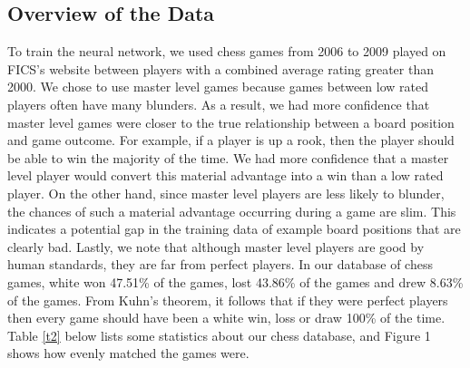 \documentclass[12pt]{article}
\begin{document}


\subsection{Overview of the Data}
To train the neural network, we used chess games from 2006 to 2009 played on FICS's website between players with a combined average rating greater than 2000. We chose to use master level games because games between low rated players often have many blunders. As a result, we had more confidence that master level games were closer to the true relationship between a board position and game outcome. For example, if a player is up a rook, then the player should be able to win the majority of the time. We had more confidence that a master level player would convert this material advantage into a win than a low rated player. On the other hand, since master level players are less likely to blunder, the chances of such a material advantage occurring during a game are slim. This indicates a potential gap in the training data of example board positions that are clearly bad. Lastly, we note that although master level players are good by human standards, they are far from perfect players. In our database of chess games, white won 47.51\% of the games, lost 43.86\% of the games and drew 8.63\% of the games. From Kuhn's theorem, it follows that if they were perfect players then every game should have been a white win, loss or draw 100\% of the time. Table \ref{t2} below lists some statistics about our chess database, and Figure 1 shows how evenly matched the games were.  %
\end{document}
